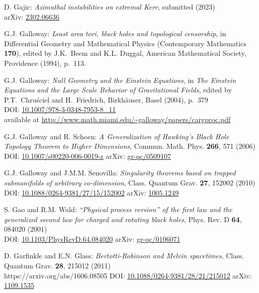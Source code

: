 \begin{thebibliography}{123}
D. Gajic:
{\em Azimuthal instabilities on extremal Kerr},
submitted (2023)\\
arXiv: \href{https://arxiv.org/abs/2302.06636}{2302.06636}

G.J. Galloway:
{\em Least area tori, black holes and topological censorship},
in {\rm Differential Geometry and Mathematical Physics}
(Contemporary Mathematics {\bf 170}),
edited by  J.K.~Beem and K.L. Duggal,
American Mathematical Society, Providence (1994), p.~113.

G.J. Galloway:
{\em Null Geometry and the Einstein Equations},
in {\em The Einstein Equations and the Large Scale Behavior of Gravitational Fields},
edited by P.T.~Chruściel and H.~Friedrich,
Birkhäuser, Basel (2004), p.~379\\
DOI: \href{https://doi.org/10.1007/978-3-0348-7953-8_11}{10.1007/978-3-0348-7953-8\_11}\\
available at
{\small \url{http://www.math.miami.edu/~galloway/papers/cargproc.pdf}}

G.J. Galloway and R. Schoen:
{\em A Generalization of Hawking’s Black Hole Topology Theorem to Higher Dimensions},
Commun. Math. Phys. {\bf 266}, 571 (2006)\\
DOI: \href{https://doi.org/10.1007/s00220-006-0019-z}{10.1007/s00220-006-0019-z}\hfill
arXiv: \href{https://arxiv.org/abs/gr-qc/0509107}{gr-qc/0509107}

G.J. Galloway and  J.M.M. Senovilla:
{\em Singularity theorems based on trapped submanifolds of arbitrary co-dimension},
Class. Quantum Grav. {\bf 27}, 152002 (2010)\\
DOI: \href{https://doi.org/10.1088/0264-9381/27/15/152002}{10.1088/0264-9381/27/15/152002}\hfill
arXiv: \href{https://arxiv.org/abs/1005.1249}{1005.1249}

S. Gao and R.M. Wald:
{\em ``Physical process version'' of the first law and the generalized second law for charged and rotating black holes},
Phys. Rev. D {\bf 64}, 084020 (2001)\\
DOI: \href{https://doi.org/10.1103/PhysRevD.64.084020}{10.1103/PhysRevD.64.084020}\hfill
arXiv: \href{https://arxiv.org/abs/gr-qc/0106071}{gr-qc/0106071}

D. Garfinkle and E.N. Glass:
{\em Bertotti-Robinson and Melvin spacetimes},
Class. Quantum Grav. {\bf 28}, 215012 (2011)\\https://arxiv.org/abs/1606.08505
DOI: \href{https://doi.org/10.1088/0264-9381/28/21/215012}{10.1088/0264-9381/28/21/215012}\hfill
arXiv: \href{https://arxiv.org/abs/1109.1535}{1109.1535}


\end{thebibliography}
